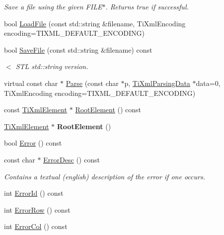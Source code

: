 \begin{DoxyCompactItemize}
\begin{DoxyCompactList}\small\item\em Save a file using the given F\+I\+L\+E$\ast$. Returns true if successful. \end{DoxyCompactList}\item 
bool \hyperlink{class_ti_xml_document_a18ae6ed34fed7991ebc220862dfac884}{Load\+File} (const std\+::string \&filename, Ti\+Xml\+Encoding encoding=T\+I\+X\+M\+L\+\_\+\+D\+E\+F\+A\+U\+L\+T\+\_\+\+E\+N\+C\+O\+D\+I\+N\+G)
\item 
\hypertarget{class_ti_xml_document_a3d4fae0463f3f03679ba0b7cf6f2df52}{bool \hyperlink{class_ti_xml_document_a3d4fae0463f3f03679ba0b7cf6f2df52}{Save\+File} (const std\+::string \&filename) const }\label{class_ti_xml_document_a3d4fae0463f3f03679ba0b7cf6f2df52}

\begin{DoxyCompactList}\small\item\em $<$ S\+T\+L std\+::string version. \end{DoxyCompactList}\item 
virtual const char $\ast$ \hyperlink{class_ti_xml_document_a789ad2f06f93d52bdb5570b2f3670289}{Parse} (const char $\ast$p, \hyperlink{class_ti_xml_parsing_data}{Ti\+Xml\+Parsing\+Data} $\ast$data=0, Ti\+Xml\+Encoding encoding=T\+I\+X\+M\+L\+\_\+\+D\+E\+F\+A\+U\+L\+T\+\_\+\+E\+N\+C\+O\+D\+I\+N\+G)
\item 
const \hyperlink{class_ti_xml_element}{Ti\+Xml\+Element} $\ast$ \hyperlink{class_ti_xml_document_ad09d17927f908f40efb406af2fb873be}{Root\+Element} () const 
\item 
\hypertarget{class_ti_xml_document_a0b43e762a23f938b06651bc90b8a1013}{\hyperlink{class_ti_xml_element}{Ti\+Xml\+Element} $\ast$ {\bfseries Root\+Element} ()}\label{class_ti_xml_document_a0b43e762a23f938b06651bc90b8a1013}

\item 
bool \hyperlink{class_ti_xml_document_a6dfc01a6e5d58e56acd537dfd3bdeb29}{Error} () const 
\item 
\hypertarget{class_ti_xml_document_a9d0f689f6e09ea494ea547be8d79c25e}{const char $\ast$ \hyperlink{class_ti_xml_document_a9d0f689f6e09ea494ea547be8d79c25e}{Error\+Desc} () const }\label{class_ti_xml_document_a9d0f689f6e09ea494ea547be8d79c25e}

\begin{DoxyCompactList}\small\item\em Contains a textual (english) description of the error if one occurs. \end{DoxyCompactList}\item 
int \hyperlink{class_ti_xml_document_af96fc2f3f9ec6422782bfe916c9e778f}{Error\+Id} () const 
\item 
int \hyperlink{class_ti_xml_document_af30efc75e804aa2e92fb8be3a8cb676e}{Error\+Row} () const 
\item 
\hypertarget{class_ti_xml_document_aa90bc630ee5203c6109ca5fad3323649}{int \hyperlink{class_ti_xml_document_aa90bc630ee5203c6109ca5fad3323649}{Error\+Col} () const }\label{class_ti_xml_document_aa90bc630ee5203c6109ca5fad3323649}


\end{DoxyCompactItemize}
